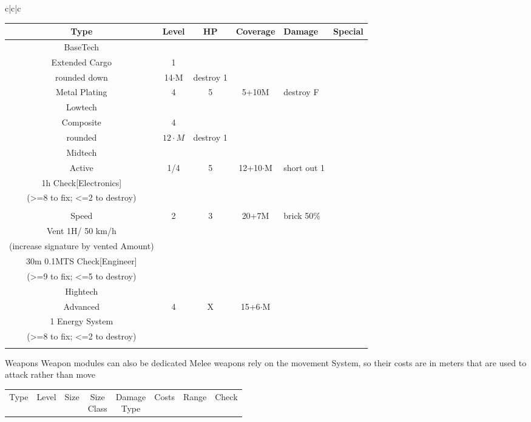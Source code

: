 \documentclass{article}
\begin{document}
\begin{tabular}{c|c|c}
    \begin{tabular}{c|cccll}
        Type & Level & HP & Coverage & Damage & Special\\
        \hline BaseTech&&&&&\\
        Extended Cargo & 1 & \makecell{\(\sqrt{M}\)\\ rounded down}& 14\(\cdot\)M & destroy 1 & \makecell[{{p{6cm}}}]{7 Cargo Spaces (Cargo is destroyed with the modules)}\\
        Metal Plating & 4 & 5 & 5+10M & destroy F & \makecell[{{p{6cm}}}]{counts twice towards movement system percentage} \\
        \hline Lowtech &&&&&\\
        Composite & 4 & \makecell[c]{\(2\cdot\sqrt{M}\)\\ rounded}& \(12\cdot M\) & destroy 1&\\
        \hline Midtech &&&&&\\
        Active & 1/4 & 5 & 12+10\(\cdot\)M & short out 1 & \makecell[{{p{6cm}}}]{ draws 10 Energy when hit \\
        1h Check[Electronics] \\(>=8 to fix; <=2 to destroy)}\\&\\
        Speed & 2 & 3 & 20+7M & brick 50\% & \makecell[{{p{6cm}}}]{1E/50km/h; \\Vent 1H/ 50 km/h \\
        (increase signature by vented Amount) \\30m 0.1MTS Check[Engineer]\\(>=9 to fix; <=5 to destroy)}\\
        \hline Hightech &&&&&\\
        Advanced & 4 & X & 15+6\(\cdot\)M & \makecell[l]{shorts out \\ 1 Energy System}&\makecell[{{p{6cm}}}]{
        1h Check[Electronics] \\(>=8 to fix; <=2 to destroy)}\\&\\
    \end{tabular}
    Weapons\newline
    Weapon modules can also be dedicated\newline
    Melee weapons rely on the movement System, so their costs are in meters that are used to attack rather than move\newline
    \begin{tabular}{c|cccclll}
        Type & Level & Size &\makecell{Size\\Class} & \makecell{Damage\\Type} & Costs & Range &Check\\

\end{tabular}
\end{tabular}
\end{document}
